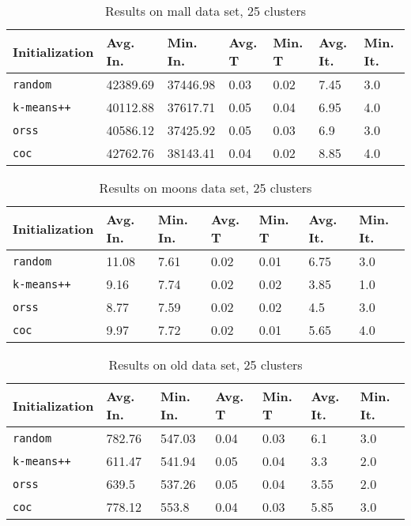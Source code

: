 \begin{table}[h]
	\begin{center}
		\begin{tabular}{|l|l|l|l|l|l|l|}
			\hline
			Initialization & Avg. In. & Min. In. & Avg. T & Min. T & Avg. It. & Min. It.\\\hline
			\texttt{random} & 42389.69 & 37446.98 & 0.03 & 0.02 & 7.45 & 3.0\\\hline
			\texttt{k-means++} & 40112.88 & 37617.71 & 0.05 & 0.04 & 6.95 & 4.0\\\hline
			\texttt{orss} & 40586.12 & 37425.92 & 0.05 & 0.03 & 6.9 & 3.0\\\hline
			\texttt{coc} & 42762.76 & 38143.41 & 0.04 & 0.02 & 8.85 & 4.0\\\hline
		\end{tabular}
		\caption{Results on mall data set, 25 clusters}
		\label{tbl:mall25}
	\end{center}
\end{table}

\begin{table}[h]
	\begin{center}
		\begin{tabular}{|l|l|l|l|l|l|l|}
			\hline
			Initialization & Avg. In. & Min. In. & Avg. T & Min. T & Avg. It. & Min. It.\\\hline
			\texttt{random} & 11.08 & 7.61 & 0.02 & 0.01 & 6.75 & 3.0\\\hline
			\texttt{k-means++} & 9.16 & 7.74 & 0.02 & 0.02 & 3.85 & 1.0\\\hline
			\texttt{orss} & 8.77 & 7.59 & 0.02 & 0.02 & 4.5 & 3.0\\\hline
			\texttt{coc} & 9.97 & 7.72 & 0.02 & 0.01 & 5.65 & 4.0\\\hline
		\end{tabular}
		\caption{Results on moons data set, 25 clusters}
		\label{tbl:moons25}
	\end{center}
\end{table}

\begin{table}[h]
	\begin{center}
		\begin{tabular}{|l|l|l|l|l|l|l|}
			\hline
			Initialization & Avg. In. & Min. In. & Avg. T & Min. T & Avg. It. & Min. It.\\\hline
			\texttt{random} & 782.76 & 547.03 & 0.04 & 0.03 & 6.1 & 3.0\\\hline
			\texttt{k-means++} & 611.47 & 541.94 & 0.05 & 0.04 & 3.3 & 2.0\\\hline
			\texttt{orss} & 639.5 & 537.26 & 0.05 & 0.04 & 3.55 & 2.0\\\hline
			\texttt{coc} & 778.12 & 553.8 & 0.04 & 0.03 & 5.85 & 3.0\\\hline
		\end{tabular}
		\caption{Results on old data set, 25 clusters}
		\label{tbl:old25}
	\end{center}
\end{table}

